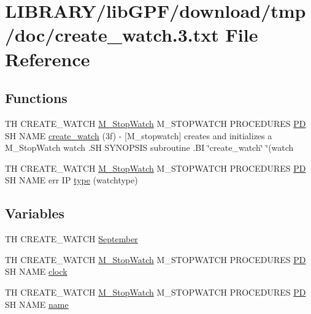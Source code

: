 \hypertarget{create__watch_83_8txt}{}\section{L\+I\+B\+R\+A\+R\+Y/lib\+G\+P\+F/download/tmp/doc/create\+\_\+watch.3.txt File Reference}
\label{create__watch_83_8txt}
\subsection*{Functions}
\begin{DoxyCompactItemize}
\item 
TH C\+R\+E\+A\+T\+E\+\_\+\+W\+A\+T\+CH \hyperlink{option__stopwatch_83_8txt_aa2011fc45a5e502e87ee50996a8a9305}{M\+\_\+\+Stop\+Watch} M\+\_\+\+S\+T\+O\+P\+W\+A\+T\+CH P\+R\+O\+C\+E\+D\+U\+R\+ES \hyperlink{what__overview_81_8txt_a85f26da5a4481fbdb0d9c79f2b94de3e}{PD} SH N\+A\+ME \hyperlink{create__watch_83_8txt_a6deb35ddebb447c9dceca30690d1581d}{create\+\_\+watch} (3f) -\/ \mbox{[}\+M\+\_\+stopwatch\mbox{]} creates and initializes a M\+\_\+\+Stop\+Watch watch .\+S\+H S\+Y\+N\+O\+P\+S\+I\+S subroutine .\+B\+I \char`\"{}create\+\_\+watch\char`\"{} \char`\"{}(watch
\item 
TH C\+R\+E\+A\+T\+E\+\_\+\+W\+A\+T\+CH \hyperlink{option__stopwatch_83_8txt_aa2011fc45a5e502e87ee50996a8a9305}{M\+\_\+\+Stop\+Watch} M\+\_\+\+S\+T\+O\+P\+W\+A\+T\+CH P\+R\+O\+C\+E\+D\+U\+R\+ES \hyperlink{what__overview_81_8txt_a85f26da5a4481fbdb0d9c79f2b94de3e}{PD} SH N\+A\+ME err IP \hyperlink{create__watch_83_8txt_a6036c8b9d18bd95ef0feb888982faa0b}{type} (watchtype)
\end{DoxyCompactItemize}
\subsection*{Variables}
\begin{DoxyCompactItemize}
\item 
TH C\+R\+E\+A\+T\+E\+\_\+\+W\+A\+T\+CH \hyperlink{create__watch_83_8txt_a3f52c4f0a971d6aad8d5872fab85fac6}{September}
\item 
TH C\+R\+E\+A\+T\+E\+\_\+\+W\+A\+T\+CH \hyperlink{option__stopwatch_83_8txt_aa2011fc45a5e502e87ee50996a8a9305}{M\+\_\+\+Stop\+Watch} M\+\_\+\+S\+T\+O\+P\+W\+A\+T\+CH P\+R\+O\+C\+E\+D\+U\+R\+ES \hyperlink{what__overview_81_8txt_a85f26da5a4481fbdb0d9c79f2b94de3e}{PD} SH N\+A\+ME \hyperlink{create__watch_83_8txt_ae5a722940632dbef0e5f6b03622fbf1c}{clock}
\item 
TH C\+R\+E\+A\+T\+E\+\_\+\+W\+A\+T\+CH \hyperlink{option__stopwatch_83_8txt_aa2011fc45a5e502e87ee50996a8a9305}{M\+\_\+\+Stop\+Watch} M\+\_\+\+S\+T\+O\+P\+W\+A\+T\+CH P\+R\+O\+C\+E\+D\+U\+R\+ES \hyperlink{what__overview_81_8txt_a85f26da5a4481fbdb0d9c79f2b94de3e}{PD} SH N\+A\+ME \hyperlink{create__watch_83_8txt_a7952910b2b90c60662fb5b4a4e85427c}{name}
\end{DoxyCompactItemize}


